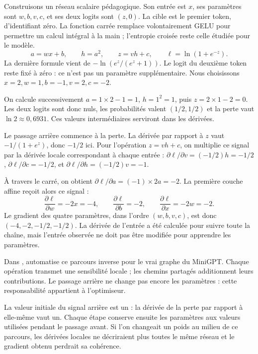 
Construisons un réseau scalaire pédagogique. Son entrée est \(x\),
ses paramètres sont \(w,b,v,c\), et ses deux logits sont
\((z,0)\). La cible est le premier token, d'identifiant zéro.
La fonction carrée remplace volontairement GELU pour permettre
un calcul intégral à la main ; l'entropie croisée reste celle
étudiée pour le modèle.
\[
 a=wx+b,\qquad h=a^2,\qquad z=vh+c,\qquad
 \ell=\ln(1+e^{-z}).
\]
La dernière formule vient de
\(-\ln(e^z/(e^z+1))\). Le logit du deuxième token reste
fixé à zéro : ce n'est pas un paramètre supplémentaire.
Nous choisissons \(x=2,w=1,b=-1,v=2,c=-2\).

On calcule successivement \(a=1\times2-1=1\),
\(h=1^2=1\), puis \(z=2\times1-2=0\).
Les deux logits sont donc nuls, les probabilités valent
\((1/2,1/2)\) et la perte vaut \(\ln2\approx0{,}6931\).
Ces valeurs intermédiaires serviront dans les dérivées.

Le passage arrière commence à la perte.
La dérivée par rapport à \(z\) vaut
\(-1/(1+e^z)\), donc \(-1/2\) ici.
Pour l'opération \(z=vh+c\), on multiplie ce signal par
la dérivée locale correspondant à chaque entrée :
\(\partial\ell/\partial v=(-1/2)h=-1/2\),
\(\partial\ell/\partial c=-1/2\), et
\(\partial\ell/\partial h=(-1/2)v=-1\).

À travers le carré, on obtient
\(\partial\ell/\partial a=(-1)\times2a=-2\).
La première couche affine reçoit alors ce signal :
\[
 \frac{\partial\ell}{\partial w}=-2x=-4,\qquad
 \frac{\partial\ell}{\partial b}=-2,\qquad
 \frac{\partial\ell}{\partial x}=-2w=-2.
\]
Le gradient des quatre paramètres, dans l'ordre \((w,b,v,c)\),
est donc \((-4,-2,-1/2,-1/2)\).
La dérivée de l'entrée a été calculée pour suivre toute la chaîne,
mais l'entrée observée ne doit pas être modifiée pour apprendre
les paramètres.

Dans ,  automatise ce
parcours inverse pour le vrai graphe du MiniGPT.
Chaque opération transmet une sensibilité locale ; les chemins
partagés additionnent leurs contributions. Le passage arrière
ne change pas encore les paramètres : cette responsabilité
appartient à l'optimiseur.

La valeur initiale du signal arrière est un :
la dérivée de la perte par rapport à elle-même vaut un.
Chaque étape conserve ensuite les paramètres aux valeurs utilisées
pendant le passage avant. Si l'on changeait un poids au milieu
de ce parcours, les dérivées locales ne décriraient plus toutes
le même réseau et le gradient obtenu perdrait sa cohérence.

